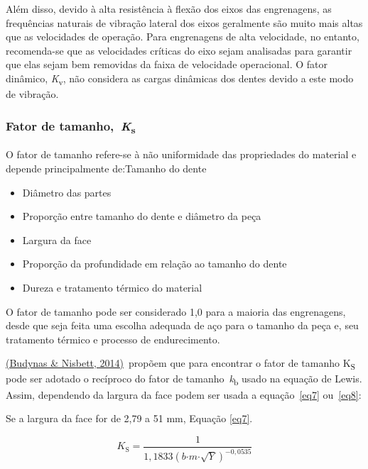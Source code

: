\documentclass[12pt,a4paper]{article}
\providecommand{\tightlist}{\setlength{\itemsep}{0pt}\setlength{\parskip}{0pt}}%
\begin{document}
Além disso, devido à alta resistência à flexão dos eixos das
engrenagens, as frequências naturais de vibração lateral dos eixos
geralmente são muito mais altas que as velocidades de operação. Para
engrenagens de alta velocidade, no entanto, recomenda-se que as
velocidades críticas do eixo sejam analisadas para garantir que elas
sejam bem removidas da faixa de velocidade operacional. O fator
dinâmico, \emph{K}\textsubscript{v}, não considera as cargas dinâmicas
dos dentes devido a este modo de vibração.

\subsubsection*{\texorpdfstring{Fator de
tamanho,~\emph{K}\textsubscript{s}}{Fator de tamanho,~Ks}}

{\label{fator-de-tamanho-ks}}

O fator de tamanho refere-se à não uniformidade das propriedades do
material e depende principalmente de:Tamanho do dente

\begin{itemize}
\tightlist
\item
  Diâmetro das partes
\item
  Proporção entre tamanho do dente e diâmetro da peça
\item
  Largura da face
\item
  Proporção da profundidade em relação ao tamanho do dente
\item
  Dureza e tratamento térmico do material
\end{itemize}

O fator de tamanho pode ser considerado 1,0 para a maioria das
engrenagens, desde que seja feita uma escolha adequada de aço para o
tamanho da peça e, seu tratamento térmico e processo de endurecimento.

\hyperref[csl:20]{(Budynas \& Nisbett, 2014)}~propõem que para encontrar o fator de tamanho
K\textsubscript{S} pode ser adotado o recíproco do fator de
tamanho~\emph{k}\textsubscript{b} usado na equação de Lewis. Assim,
dependendo da largura da face podem ser usada a
equação~{\ref{eq7}} ou~{\ref{eq8}}:

Se a largura da face for de 2,79 a 51 mm, Equação
{\ref{eq7}}.

\begin{equation}
    \label{eq7}
K_{\mathrm{S}}\mathrm{=}\frac{\mathrm{1}}{\mathrm{1,1833}{\left(b\mathrm{\cdot }m\mathrm{\cdot }\sqrt{Y}\right)}^{\mathrm{-}\mathrm{0,0535}}}
\end{equation}
\end{document}
